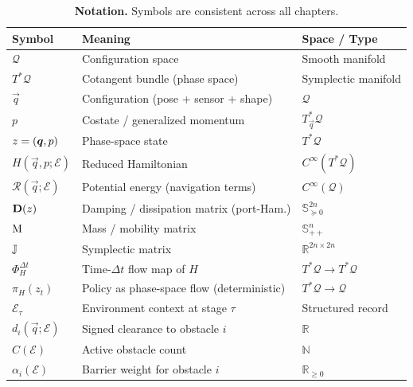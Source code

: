 \begin{table}[h]
\centering
\caption{\textbf{Notation.} Symbols are consistent across all chapters.}
\label{tab:notation}
\small
\setlength{\tabcolsep}{6pt}
\renewcommand{\arraystretch}{1.25}
\begin{tabular}{lll}
\toprule
\textbf{Symbol} & \textbf{Meaning} & \textbf{Space / Type} \\
\midrule
$\mathcal{Q}$               & Configuration space                      & Smooth manifold \\
$T^*\mathcal{Q}$            & Cotangent bundle (phase space)            & Symplectic manifold \\
$\vec{q}$                   & Configuration (pose + sensor + shape)     & $\mathcal{Q}$ \\
$p$                         & Costate / generalized momentum            & $T^*_{\vec{q}}\mathcal{Q}$ \\
$z = (\boldsymbol{q},p)$ & Phase-space state                         & $T^*\mathcal{Q}$ \\
$H(\vec{q},p;\mathcal{E})$  & Reduced Hamiltonian                       & $C^\infty(T^*\mathcal{Q})$ \\
$\mathcal{R}(\vec{q};\mathcal{E})$ & Potential energy (navigation terms) & $C^\infty(\mathcal{Q})$ \\
$\mathbf{D}(z)$   & Damping / dissipation matrix (port-Ham.) & $\mathbb{S}^{2n}_{\succeq 0}$ \\
$\mathrm{M}$                     & Mass / mobility matrix                    & $\mathbb{S}^n_{++}$ \\
$\mathbb{J}$                        & Symplectic matrix                         & $\mathbb{R}^{2n\times 2n}$ \\
$\Phi^{\Delta t}_H$         & Time-$\Delta t$ flow map of $H$           & $T^*\mathcal{Q}\to T^*\mathcal{Q}$ \\
$\pi_H(z_t)$                & Policy as phase-space flow (deterministic) & $T^*\mathcal{Q}\to\mathcal{Q}$ \\
$\mathcal{E}_\tau$          & Environment context at stage $\tau$       & Structured record \\
$d_i(\vec{q};\mathcal{E})$  & Signed clearance to obstacle $i$          & $\mathbb{R}$ \\
$C(\mathcal{E})$            & Active obstacle count                     & $\mathbb{N}$ \\
$\alpha_i(\mathcal{E})$     & Barrier weight for obstacle $i$           & $\mathbb{R}_{\geq 0}$ \\

\end{tabular}
\end{table}
